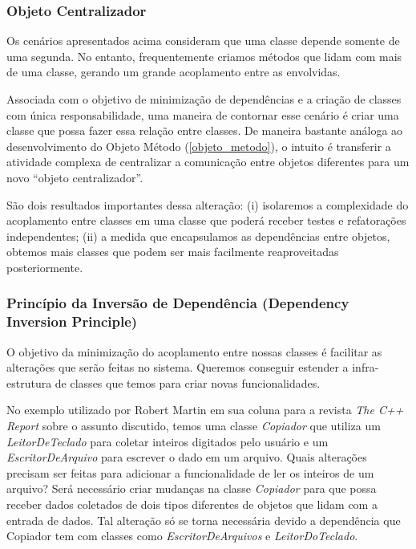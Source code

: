 

\subsubsection{Objeto Centralizador}
Os cenários apresentados acima consideram que uma classe depende somente de uma segunda. No entanto, frequentemente criamos métodos 
que lidam com mais de uma classe, gerando um grande acoplamento entre as envolvidas.

Associada com o objetivo de minimização de dependências e a criação de classes com única responsabilidade, uma 
maneira de contornar esse cenário é criar uma classe que possa fazer essa relação entre classes. De maneira 
bastante análoga ao desenvolvimento do Objeto Método 
(\ref{objeto_metodo}), o intuito é transferir a atividade complexa de centralizar a comunicação entre objetos 
diferentes para um novo ``objeto centralizador''.

São dois resultados importantes dessa alteração: (i) isolaremos a complexidade do acoplamento entre classes em uma classe que poderá receber testes e refatorações independentes; (ii) a medida que encapsulamos as dependências entre objetos, obtemos mais classes que podem ser mais facilmente reaproveitadas posteriormente.

\subsubsection{Princípio da Inversão de Dependência (Dependency Inversion Principle)}
O objetivo da minimização do acoplamento entre nossas classes é facilitar as alterações que serão feitas no sistema. Queremos conseguir estender a infra-estrutura de classes que temos para criar novas funcionalidades.
	
No exemplo utilizado por Robert Martin em sua coluna para a revista \textit{The C++ Report}
sobre o assunto discutido, temos uma classe  \textit{Copiador} que utiliza um \textit{LeitorDeTeclado} para coletar inteiros digitados pelo usuário e um  \textit{EscritorDeArquivo} para escrever o dado em um arquivo. Quais alterações precisam ser feitas  para adicionar a funcionalidade de ler os inteiros de um arquivo? Será necessário criar mudanças na classe  \textit{Copiador} para que possa receber dados coletados de dois tipos diferentes de objetos que lidam com a entrada de dados. Tal alteração só se torna necessária devido a dependência que Copiador tem com classes como \textit{EscritorDeArquivos} e \textit{LeitorDoTeclado}.
	
